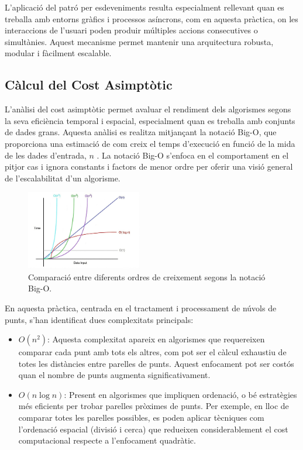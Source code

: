 \documentclass{ieeetj}
\begin{document}
L'aplicació del patró per esdeveniments resulta especialment rellevant quan es treballa amb entorns gràfics i processos asíncrons, com en aquesta pràctica, on les interaccions de l’usuari poden produir múltiples accions consecutives o simultànies. Aquest mecanisme permet mantenir una arquitectura robusta, modular i fàcilment escalable.

\subsection{Càlcul del Cost Asimptòtic}
L’anàlisi del cost asimptòtic permet avaluar el rendiment dels algorismes segons la seva eficiència temporal i espacial, especialment quan es treballa amb conjunts de dades grans. Aquesta anàlisi es realitza mitjançant la notació Big-O, que proporciona una estimació de com creix el temps d’execució en funció de la mida de les dades d’entrada, \(n\) \cite{bigOAnalysis}. La notació Big-O s’enfoca en el comportament en el pitjor cas i ignora constants i factors de menor ordre per oferir una visió general de l’escalabilitat d’un algorisme.

\begin{figure}[htbp]
\centerline{\includegraphics[width=0.45\textwidth]{png/bigO.jpg}}
\caption{Comparació entre diferents ordres de creixement segons la notació Big-O.}
\label{fig:big_o}
\end{figure}

En aquesta pràctica, centrada en el tractament i processament de núvols de punts, s’han identificat dues complexitats principals:

\begin{itemize}
    \item \textbf{\(O(n^2)\)}: Aquesta complexitat apareix en algorismes que requereixen comparar cada punt amb tots els altres, com pot ser el càlcul exhaustiu de totes les distàncies entre parelles de punts. Aquest enfocament pot ser costós quan el nombre de punts augmenta significativament.
    \item \textbf{\(O(n \log n)\)}: Present en algorismes que impliquen ordenació, o bé estratègies més eficients per trobar parelles pròximes de punts. Per exemple, en lloc de comparar totes les parelles possibles, es poden aplicar tècniques com l’ordenació espacial (divisió i cerca) que redueixen considerablement el cost computacional respecte a l’enfocament quadràtic.
\end{itemize}
\end{document}
